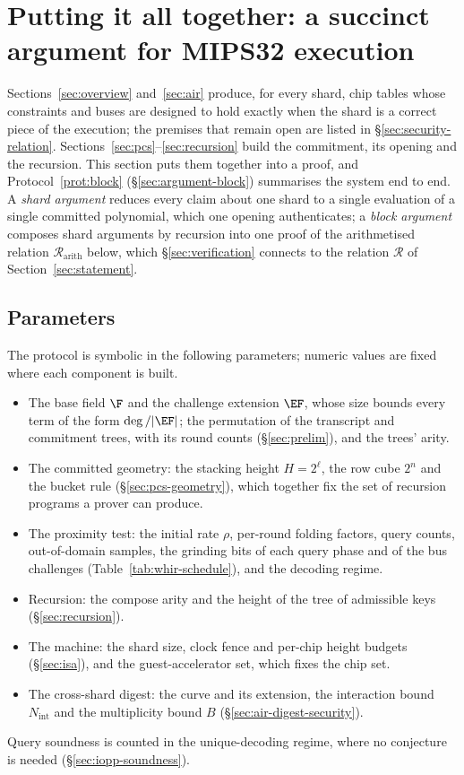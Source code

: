 \section{Putting it all together: a succinct argument for MIPS32 execution}
\label{sec:argument}

Sections~\ref{sec:overview} and~\ref{sec:air} produce, for every shard, chip tables whose constraints and buses are designed to hold exactly when the shard is a correct piece of the execution; the premises that remain open are listed in \S\ref{sec:security-relation}. Sections~\ref{sec:pcs}--\ref{sec:recursion} build the commitment, its opening and the recursion. This section puts them together into a proof, and Protocol~\ref{prot:block} (\S\ref{sec:argument-block}) summarises the system end to end. A \emph{shard argument} reduces every claim about one shard to a single evaluation of a single committed polynomial, which one opening authenticates; a \emph{block argument} composes shard arguments by recursion into one proof of the arithmetised relation $\mathcal R_{\mathrm{arith}}$ below, which \S\ref{sec:verification} connects to the relation $\mathcal R$ of Section~\ref{sec:statement}.

\subsection{Parameters}
\label{sec:argument-params}

The protocol is symbolic in the following parameters; numeric values are fixed where each component is built.
\begin{itemize}
  \item The base field $\F$ and the challenge extension $\EF$, whose size bounds every term of the form $\deg/|\EF|$; the permutation of the transcript and commitment trees, with its round counts (\S\ref{sec:prelim}), and the trees' arity.
  \item The committed geometry: the stacking height $H=2^{\ell}$, the row cube $2^{n}$ and the bucket rule (\S\ref{sec:pcs-geometry}), which together fix the set of recursion programs a prover can produce.
  \item The proximity test: the initial rate $\rho$, per-round folding factors, query counts, out-of-domain samples, the grinding bits of each query phase and of the bus challenges (Table~\ref{tab:whir-schedule}), and the decoding regime.
  \item Recursion: the compose arity and the height of the tree of admissible keys (\S\ref{sec:recursion}).
  \item The machine: the shard size, clock fence and per-chip height budgets (\S\ref{sec:isa}), and the guest-accelerator set, which fixes the chip set.
  \item The cross-shard digest: the curve and its extension, the interaction bound $N_{\mathrm{int}}$ and the multiplicity bound $B$ (\S\ref{sec:air-digest-security}).
\end{itemize}
Query soundness is counted in the unique-decoding regime, where no conjecture is needed (\S\ref{sec:iopp-soundness}).

